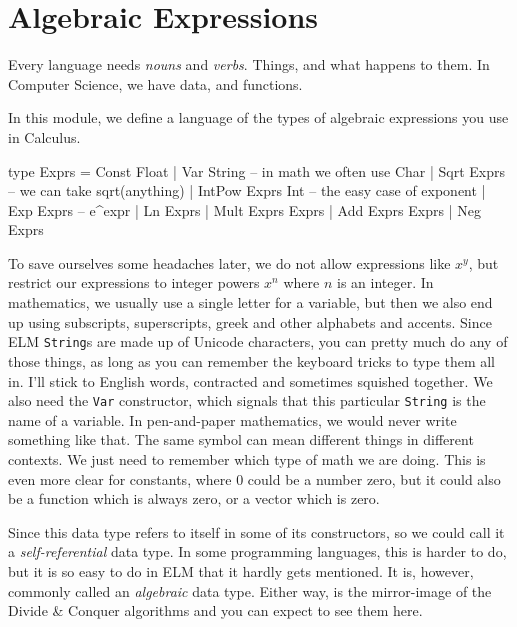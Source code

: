 \documentclass[12pt]{amsbook}
\begin{document}
%  
%  

\chapter{Algebraic Expressions}

Every language needs \emph{nouns} and \emph{verbs}.  
Things, and what happens to them.
In Computer Science, we have data, and functions.

In this module, we define a language of the types of algebraic expressions you use in Calculus.

\begin{code}
type Exprs = Const Float
           | Var String         -- in math we often use Char
           | Sqrt Exprs         -- we can take sqrt(anything)
           | IntPow Exprs Int   -- the easy case of exponent
           | Exp Exprs          -- e^expr
           | Ln Exprs
           | Mult Exprs Exprs
           | Add Exprs Exprs
           | Neg Exprs
\end{code}
To save ourselves some headaches later, we do not allow 
expressions like $x^y$, but restrict our expressions to 
integer powers $x^n$ where $n$ is an integer.
In mathematics, we usually use a single letter for a variable,
but then we also end up using subscripts, superscripts, greek and other 
alphabets and accents.
Since ELM \verb|String|s are made up of Unicode characters,
you can pretty much do any of those things, as long as you can
remember the keyboard tricks to type them all in.
I'll stick to English words, contracted and sometimes squished together.
We also need the \verb|Var| constructor, which signals that this particular \verb|String| is the name of a variable.
In pen-and-paper mathematics, we would never write something like that.
The same symbol can mean different things in different contexts.
We just need to remember which type of math we are doing.
This is even more clear for constants,
where $0$ could be a number zero, but it could also be a function which is always zero, or a vector which is zero.

Since this data type refers to itself in some of its constructors,
so we could call it a \emph{self-referential} data type.
In some programming languages, 
this is harder to do, but it is so easy to do in
ELM that it hardly gets mentioned.
It is, however, commonly called an \emph{algebraic} data type.
Either way, is the mirror-image of the Divide \& Conquer algorithms
and you can expect to see them here.
\end{document}
